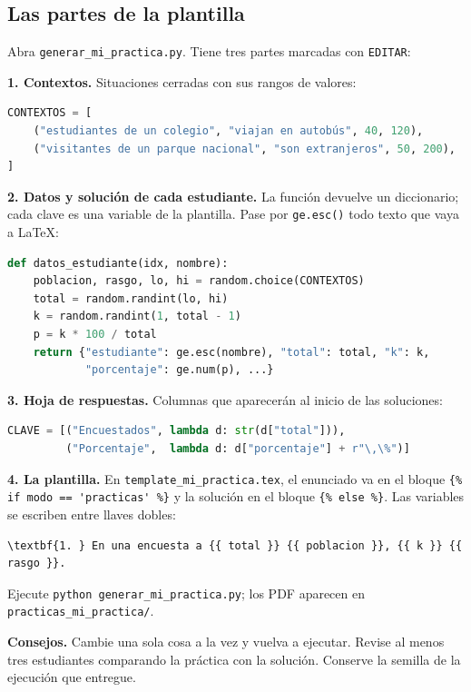 \documentclass[11pt]{article}
\newcommand{\cod}[1]{\texttt{#1}}
\begin{document}
\subsection{Las partes de la plantilla}

Abra \cod{generar\_mi\_practica.py}. Tiene tres partes marcadas con \cod{EDITAR}:

\textbf{1. Contextos.} Situaciones cerradas con sus rangos de valores:
\begin{lstlisting}[language=Python]
CONTEXTOS = [
    ("estudiantes de un colegio", "viajan en autobús", 40, 120),
    ("visitantes de un parque nacional", "son extranjeros", 50, 200),
]
\end{lstlisting}

\textbf{2. Datos y solución de cada estudiante.} La función devuelve un diccionario; cada clave es una variable de la plantilla. Pase por \cod{ge.esc()} todo texto que vaya a \LaTeX:
\begin{lstlisting}[language=Python]
def datos_estudiante(idx, nombre):
    poblacion, rasgo, lo, hi = random.choice(CONTEXTOS)
    total = random.randint(lo, hi)
    k = random.randint(1, total - 1)
    p = k * 100 / total
    return {"estudiante": ge.esc(nombre), "total": total, "k": k,
            "porcentaje": ge.num(p), ...}
\end{lstlisting}

\textbf{3. Hoja de respuestas.} Columnas que aparecerán al inicio de las soluciones:
\begin{lstlisting}[language=Python]
CLAVE = [("Encuestados", lambda d: str(d["total"])),
         ("Porcentaje",  lambda d: d["porcentaje"] + r"\,\%")]
\end{lstlisting}

\textbf{4. La plantilla.} En \cod{template\_mi\_practica.tex}, el enunciado va en el bloque \verb|{% if modo == 'practicas' %}| y la solución en el bloque \verb|{% else %}|. Las variables se escriben entre llaves dobles:
\begin{lstlisting}
\textbf{1. } En una encuesta a {{ total }} {{ poblacion }}, {{ k }} {{ rasgo }}.
\end{lstlisting}

Ejecute \cod{python generar\_mi\_practica.py}; los PDF aparecen en \cod{practicas\_mi\_practica/}.

\begin{nota}
\textbf{Consejos.} Cambie una sola cosa a la vez y vuelva a ejecutar. Revise al menos tres estudiantes comparando la práctica con la solución. Conserve la semilla de la ejecución que entregue.
\end{nota}
\end{document}

